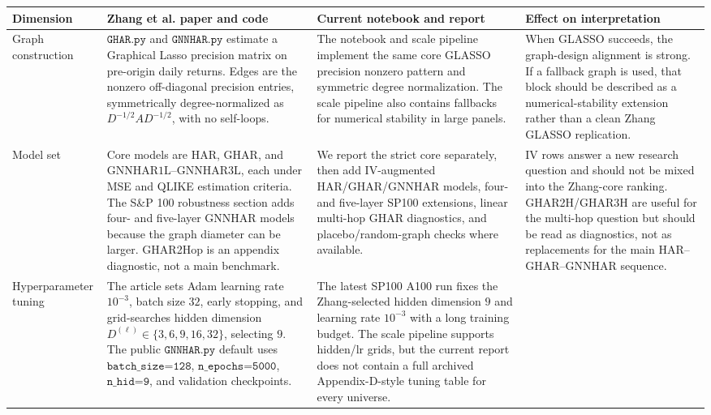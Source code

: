 \documentclass[11pt]{article}
\begin{document}
\begin{table}[H]
\centering
\scriptsize
\setlength{\tabcolsep}{4pt}
\renewcommand{\arraystretch}{1.12}
\begin{tabular}{
>{\raggedright\arraybackslash}p{}
>{\raggedright\arraybackslash}p{}
>{\raggedright\arraybackslash}p{}
>{\raggedright\arraybackslash}p{}}
\toprule
Dimension & Zhang et al. paper and code & Current notebook and report & Effect on interpretation \\
\midrule
Graph construction
& \(\texttt{GHAR.py}\) and \(\texttt{GNNHAR.py}\) estimate a Graphical Lasso precision matrix on pre-origin daily returns.  Edges are the nonzero off-diagonal precision entries, symmetrically degree-normalized as \(D^{-1/2}AD^{-1/2}\), with no self-loops.
& The notebook and scale pipeline implement the same core GLASSO precision nonzero pattern and symmetric degree normalization.  The scale pipeline also contains fallbacks for numerical stability in large panels.
& When GLASSO succeeds, the graph-design alignment is strong.  If a fallback graph is used, that block should be described as a numerical-stability extension rather than a clean Zhang GLASSO replication. \\
\addlinespace
Model set
& Core models are \(\mathrm{HAR}\), \(\mathrm{GHAR}\), and \(\mathrm{GNNHAR1L}\)--\(\mathrm{GNNHAR3L}\), each under MSE and QLIKE estimation criteria.  The S\&P 100 robustness section adds four- and five-layer GNNHAR models because the graph diameter can be larger.  GHAR2Hop is an appendix diagnostic, not a main benchmark.
& We report the strict core separately, then add IV-augmented HAR/GHAR/GNNHAR models, four- and five-layer SP100 extensions, linear multi-hop GHAR diagnostics, and placebo/random-graph checks where available.
& IV rows answer a new research question and should not be mixed into the Zhang-core ranking.  GHAR2H/GHAR3H are useful for the multi-hop question but should be read as diagnostics, not as replacements for the main HAR--GHAR--GNNHAR sequence. \\
\addlinespace
Hyperparameter tuning
& The article sets Adam learning rate \(10^{-3}\), batch size \(32\), early stopping, and grid-searches hidden dimension \(D^{(\ell)}\in\{3,6,9,16,32\}\), selecting \(9\).  The public \(\texttt{GNNHAR.py}\) default uses \(\texttt{batch\_size=128}\), \(\texttt{n\_epochs=5000}\), \(\texttt{n\_hid=9}\), and validation checkpoints.
& The latest SP100 A100 run fixes the Zhang-selected hidden dimension \(9\) and learning rate \(10^{-3}\) with a long training budget.  The scale pipeline supports hidden/lr grids, but the current report does not contain a full archived Appendix-D-style tuning table for every universe.

\end{tabular}
\end{table}
\end{document}
